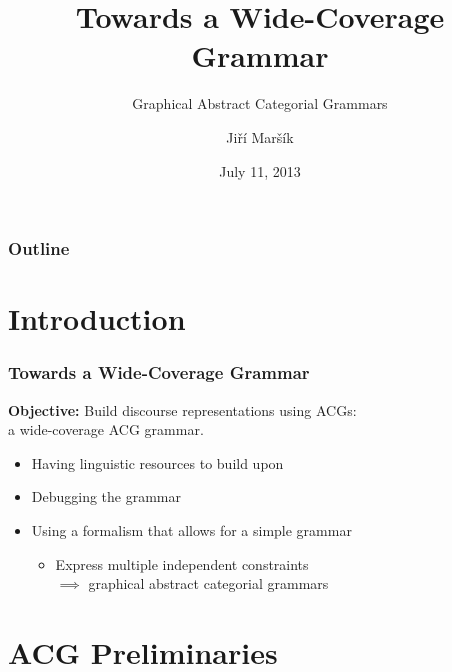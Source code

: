 \documentclass{beamer}
\begin{document}
\title[G-ACGs]{Towards a Wide-Coverage Grammar}
\subtitle{Graphical Abstract Categorial Grammars}
\author{Ji\v{r}\'{i} Mar\v{s}\'{i}k}
\date[June 2013]{July 11, 2013}

\frame{\titlepage \setcounter{framenumber}{1}}

\begin{frame}
\frametitle{Outline}
\tableofcontents
\end{frame}

\section{Introduction}

\begin{frame}
  \frametitle{Towards a Wide-Coverage Grammar}

  \textbf{Objective:} Build discourse representations using ACGs: \\a
  wide-coverage ACG grammar.

  \vfill

  \begin{itemize}
  \item Having linguistic resources to build upon
    \vfill
  \item Debugging the grammar
    \vfill
  \item Using a formalism that allows for a simple grammar
    \begin{itemize}
    \item Express multiple independent constraints \\ $\implies$ graphical abstract categorial grammars
    \end{itemize}
  \end{itemize}
\end{frame}


\section{ACG Preliminaries}

\newcommand{\synt}[1]{C_{\textrm{#1}}}
\end{document}
